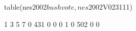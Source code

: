 \begin{Schunk}
\begin{Sinput}
 table(nes2002$bushvote, nes2002$V023111) 
\end{Sinput}
\begin{Soutput}
      1   3   5   7
  0 431   0   0   0
  1   0 502   0   0
\end{Soutput}
\end{Schunk}
